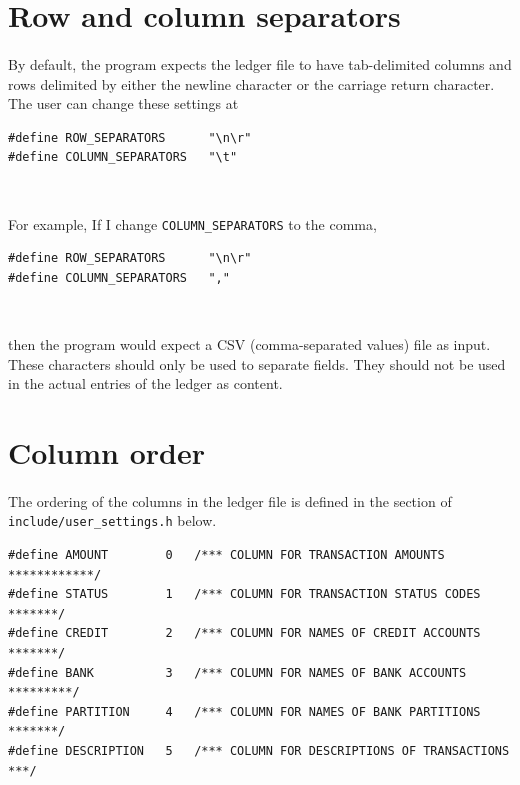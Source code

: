\documentclass{article}
\providecommand{\q}{$\quad$ \newline}
\begin{document}
\begin{flushleft}
\begin{center}
\begin{tabular}{lp{11cm}}
\end{tabular}
\end{center}



\section{Row and column separators}

\paragraph{} By default, the program expects the ledger file to have tab-delimited columns and rows delimited by either the newline character or the carriage return character. The user can change these settings at  \q

\begin{lstlisting}
#define ROW_SEPARATORS      "\n\r"
#define COLUMN_SEPARATORS   "\t" 
\end{lstlisting} \q

For example, If I change {\tt COLUMN\_SEPARATORS} to the comma, \q

\begin{lstlisting}
#define ROW_SEPARATORS      "\n\r"
#define COLUMN_SEPARATORS   "," 
\end{lstlisting} \q

then the program would expect a CSV (comma-separated values) file as input. These characters should only be used to separate fields. They should not be used in the actual entries of the ledger as content.



\section{Column order}


\paragraph{} The ordering of the columns in the ledger file is defined in the section of {\tt include/user\_settings.h} below.

\begin{lstlisting}
#define AMOUNT        0   /*** COLUMN FOR TRANSACTION AMOUNTS ************/
#define STATUS        1   /*** COLUMN FOR TRANSACTION STATUS CODES *******/
#define CREDIT        2   /*** COLUMN FOR NAMES OF CREDIT ACCOUNTS *******/
#define BANK          3   /*** COLUMN FOR NAMES OF BANK ACCOUNTS *********/       
#define PARTITION     4   /*** COLUMN FOR NAMES OF BANK PARTITIONS *******/
#define DESCRIPTION   5   /*** COLUMN FOR DESCRIPTIONS OF TRANSACTIONS ***/
\end{lstlisting} \q


\end{flushleft}
\end{document}
